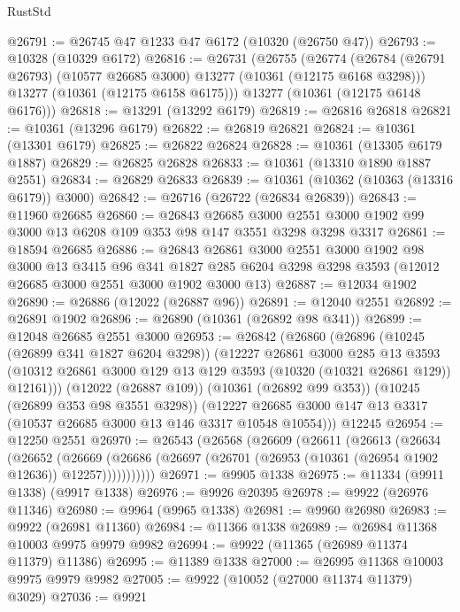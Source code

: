 \begin{lexlean}{RustStd}
\begin{coremodule}
@26791 := @26745 @47 @1233 @47 @6172 (@10320 (@26750 @47))
@26793 := @10328 (@10329 @6172)
@26816 := @26731
    (@26755
      (@26774
        (@26784 (@26791 @26793) (@10577 @26685 @3000) @13277 (@10361 (@12175 @6168 @3298)))
        @13277
        (@10361 (@12175 @6158 @6175)))
      @13277
      (@10361 (@12175 @6148 @6176)))
@26818 := @13291 (@13292 @6179)
@26819 := @26816 @26818
@26821 := @10361 (@13296 @6179)
@26822 := @26819 @26821
@26824 := @10361 (@13301 @6179)
@26825 := @26822 @26824
@26828 := @10361 (@13305 @6179 @1887)
@26829 := @26825 @26828
@26833 := @10361 (@13310 @1890 @1887 @2551)
@26834 := @26829 @26833
@26839 := @10361 (@10362 (@10363 (@13316 @6179)) @3000)
@26842 := @26716 (@26722 (@26834 @26839))
@26843 := @11960 @26685
@26860 := @26843
    @26685
    @3000
    @2551
    @3000
    @1902
    @99
    @3000
    @13
    @6208
    @109
    @353
    @98
    @147
    @3551
    @3298
    @3298
    @3317
@26861 := @18594 @26685
@26886 := @26843
    @26861
    @3000
    @2551
    @3000
    @1902
    @98
    @3000
    @13
    @3415
    @96
    @341
    @1827
    @285
    @6204
    @3298
    @3298
    @3593
    (@12012 @26685 @3000 @2551 @3000 @1902 @3000 @13)
@26887 := @12034 @1902
@26890 := @26886 (@12022 (@26887 @96))
@26891 := @12040 @2551
@26892 := @26891 @1902
@26896 := @26890 (@10361 (@26892 @98 @341))
@26899 := @12048 @26685 @2551 @3000
@26953 := @26842
    (@26860
      (@26896
        (@10245 (@26899 @341 @1827 @6204 @3298))
        (@12227
          @26861
          @3000
          @285
          @13
          @3593
          (@10312 @26861 @3000 @129 @13 @129 @3593 (@10320 (@10321 @26861 @129)) @12161)))
      (@12022 (@26887 @109))
      (@10361 (@26892 @99 @353))
      (@10245 (@26899 @353 @98 @3551 @3298))
      (@12227 @26685 @3000 @147 @13 @3317 (@10537 @26685 @3000 @13 @146 @3317 @10548 @10554)))
    @12245
@26954 := @12250 @2551
@26970 := @26543
    (@26568
      (@26609
        (@26611
          (@26613
            (@26634
              (@26652
                (@26669
                  (@26686 (@26697 (@26701 (@26953 (@10361 (@26954 @1902 @12636)) @12257)))))))))))
@26971 := @9905 @1338
@26975 := @11334 (@9911 @1338) (@9917 @1338)
@26976 := @9926 @20395
@26978 := @9922 (@26976 @11346)
@26980 := @9964 (@9965 @1338)
@26981 := @9960 @26980
@26983 := @9922 (@26981 @11360)
@26984 := @11366 @1338
@26989 := @26984 @11368 @10003 @9975 @9979 @9982
@26994 := @9922 (@11365 (@26989 @11374 @11379) @11386)
@26995 := @11389 @1338
@27000 := @26995 @11368 @10003 @9975 @9979 @9982
@27005 := @9922 (@10052 (@27000 @11374 @11379) @3029)
@27036 := @9921

\end{coremodule}
\end{lexlean}
